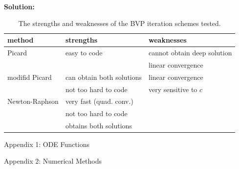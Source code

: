\documentclass[11pt]{article}
\begin{document}
\begin{enumerate}
\bigskip
\textbf{Solution:} 
\begin{table}[h]
\begin{center}
\begin{tabular}{lll}
  \hline
  method & strengths & weaknesses \\
  \hline
  \hline
  Picard & easy to code & cannot obtain deep solution\\
         & & linear convergence\\
  \hline
  modifid Picard & can obtain both solutions & linear convergence\\
            & not too hard to code & very sensitive to $c$\\
  \hline
  Newton-Raphson & very fast (quad. conv.) & \\
            & not too hard to code & \\
            & obtains both solutions & \\
  \hline
\end{tabular}
\caption{The strengths and weaknesses of the BVP iteration schemes tested.}
\end{center}
\end{table}
\end{enumerate}

\clearpage
\pagebreak
{\huge Appendix 1: ODE Functions}


\clearpage
\pagebreak
{\huge Appendix 2: Numerical Methods}




\end{document}
